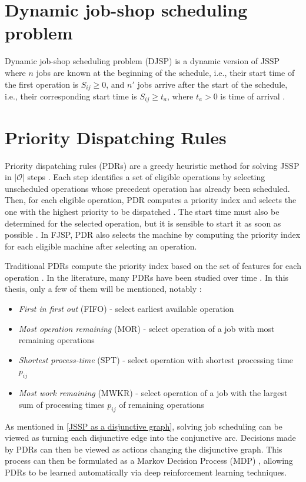 \section{Dynamic job-shop scheduling problem}

Dynamic job-shop scheduling problem (DJSP) is a dynamic version of JSSP where $n$ jobs are known at the beginning of the schedule, i.e., their start time of the first operation is $S_{ij} \geq 0$, and $n'$ jobs arrive after the start of the schedule, i.e., their corresponding start time is $S_{ij} \geq t_a$, where $t_a > 0$ is time of arrival \cite{KUNDAKCI201631, Haupt_1989a}.

\section{Priority Dispatching Rules} \label{priority dispatching rules}
Priority dispatching rules (PDRs) are a greedy heuristic method for solving JSSP in $\left|\mathcal{O}\right|$ steps \cite{zhang2020learning}. Each step identifies a set of eligible operations by selecting unscheduled operations whose precedent operation has already been scheduled. Then, for each eligible operation, PDR computes a priority index and selects the one with the highest priority to be dispatched \cite{zhang2020learning}. The start time must also be determined for the selected operation, but it is sensible to start it as soon as possible \cite{discovering_dispatching_rules}. In FJSP, PDR also selects the machine by computing the priority index for each eligible machine after selecting an operation.
\par
Traditional PDRs compute the priority index based on the set of features for each operation \cite{Haupt_1989a}. In the literature, many PDRs have been studied over time \cite{doi:10.1080/00207543.2011.611539, Haupt_1989a, discovering_dispatching_rules, 7232991}. In this thesis, only a few of them will be mentioned, notably \cite{10226873, Haupt_1989a}:
\begin{itemize}
    \item \textit{First in first out} (FIFO) - select earliest available operation 
    \item \textit{Most operation remaining} (MOR) - select operation of a job with most remaining operations
    \item \textit{Shortest process-time} (SPT) - select operation with shortest processing time $p_{ij}$
    \item \textit{Most work remaining} (MWKR) - select operation of a job with the largest sum of processing times $p_{ij}$ of remaining operations
\end{itemize}
As mentioned in \ref{JSSP as a disjunctive graph}, solving job scheduling can be viewed as turning each disjunctive edge into the conjunctive arc. Decisions made by PDRs can then be viewed as actions changing the disjunctive graph. This process can then be formulated as a Markov Decision Process (MDP) \cite{zhang2020learning, jssp_rl_env}, allowing PDRs to be learned automatically via deep reinforcement learning techniques.

